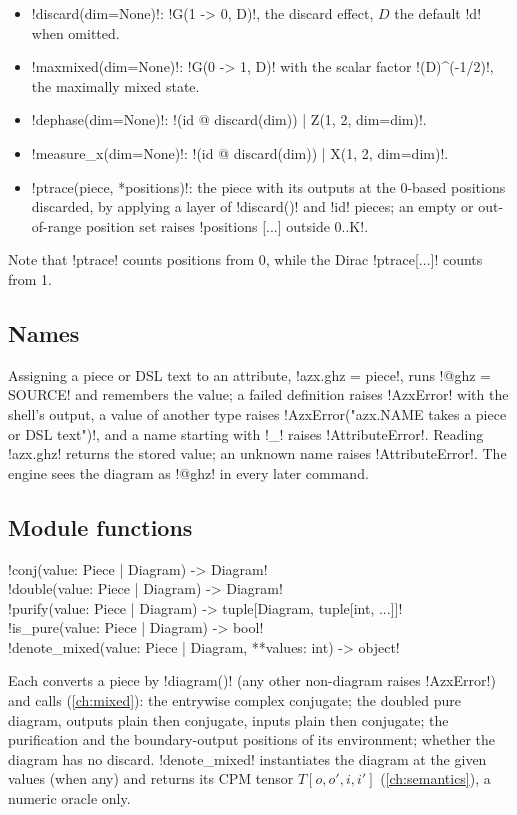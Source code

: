 \begin{itemize}
\item \py!discard(dim=None)!: \code!G(1 -> 0, D)!, the discard effect, $D$ the default \code!d! when omitted.
\item \py!maxmixed(dim=None)!: \code!G(0 -> 1, D)! with the scalar factor \code!(D)^(-1/2)!, the maximally mixed state.
\item \py!dephase(dim=None)!: \py!(id @ discard(dim)) | Z(1, 2, dim=dim)!.
\item \py!measure_x(dim=None)!: \py!(id @ discard(dim)) | X(1, 2, dim=dim)!.
\item \py!ptrace(piece, *positions)!: the piece with its outputs at the 0-based positions discarded, by applying a layer of \py!discard()! and \py!id! pieces; an empty or out-of-range position set raises \code!positions [...] outside 0..K!.
\end{itemize}
Note that \py!ptrace! counts positions from 0, while the Dirac \code!ptrace[...]! counts from 1.

\subsection{Names}

Assigning a piece or DSL text to an attribute, \py!azx.ghz = piece!, runs \code!@ghz = SOURCE! and remembers the value; a failed definition raises \py!AzxError! with the shell's output, a value of another type raises \code!AzxError("azx.NAME takes a piece or DSL text")!, and a name starting with \code!_! raises \py!AttributeError!. Reading \py!azx.ghz! returns the stored value; an unknown name raises \py!AttributeError!. The engine sees the diagram as \code!@ghz! in every later command.

\subsection{Module functions}

\begin{signature}
\py!conj(value: Piece | Diagram) -> Diagram!\\
\py!double(value: Piece | Diagram) -> Diagram!\\
\py!purify(value: Piece | Diagram) -> tuple[Diagram, tuple[int, ...]]!\\
\py!is_pure(value: Piece | Diagram) -> bool!\\
\py!denote_mixed(value: Piece | Diagram, **values: int) -> object!
\end{signature}
Each converts a piece by \py!diagram()! (any other non-diagram raises \py!AzxError!) and calls  (\cref{ch:mixed}): the entrywise complex conjugate; the doubled pure diagram, outputs plain then conjugate, inputs plain then conjugate; the purification and the boundary-output positions of its environment; whether the diagram has no discard. \py!denote_mixed! instantiates the diagram at the given values (when any) and returns its CPM tensor $T[o,o',i,i']$ (\cref{ch:semantics}), a numeric oracle only.

